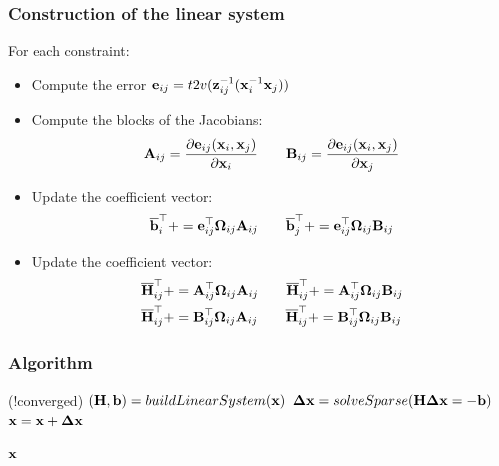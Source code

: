    \begin{frame}
   \frametitle{Construction of the linear system}
   For each constraint:
   \begin{itemize}
   \item Compute the error $\boldsymbol{\mathbf{e}}_{ij} = t2v({\boldsymbol{\mathbf{z}}}^{-1}_{ij}({\boldsymbol{\mathbf{x}}}^{-1}_{i}\boldsymbol{\mathbf{x}}_{j}))$
   \item Compute the blocks of the Jacobians:
   \begin{equation*}
   \boldsymbol{\mathbf{A}}_{ij} = \dfrac{\partial\boldsymbol{\mathbf{e}} _{ij}(\boldsymbol{\mathbf{x}} _{i}, \boldsymbol{\mathbf{x}} _{j})}{\partial\boldsymbol{\mathbf{x}} _{i}} \quad \quad \boldsymbol{\mathbf{B}}_{ij} = \dfrac{\partial\boldsymbol{\mathbf{e}} _{ij}(\boldsymbol{\mathbf{x}} _{i}, \boldsymbol{\mathbf{x}} _{j})}{\partial\boldsymbol{\mathbf{x}} _{j}}
    \end{equation*}
    \item Update the coefficient vector:
    \begin{equation*}
    \overline{\boldsymbol{\mathbf{b}}}_{i}^{\top} += \boldsymbol{\mathbf{e}}_{ij}^{\top}\boldsymbol{\mathbf{\Omega}}_{ij}\boldsymbol{\mathbf{A}}_{ij} \quad \quad \overline{\boldsymbol{\mathbf{b}}}_{j}^{\top} += \boldsymbol{\mathbf{e}}_{ij}^{\top}\boldsymbol{\mathbf{\Omega}}_{ij}\boldsymbol{\mathbf{B}}_{ij}
    \end{equation*}
   
    \item Update the coefficient vector:
    \begin{align*}
    \overline{\boldsymbol{\mathbf{H}}}_{ij}^{\top} &+= \boldsymbol{\mathbf{A}}_{ij}^{\top}\boldsymbol{\mathbf{\Omega}}_{ij}\boldsymbol{\mathbf{A}}_{ij} \quad \quad \overline{\boldsymbol{\mathbf{H}}}_{ij}^{\top} += \boldsymbol{\mathbf{A}}_{ij}^{\top}\boldsymbol{\mathbf{\Omega}}_{ij}\boldsymbol{\mathbf{B}}_{ij} \\
    \overline{\boldsymbol{\mathbf{H}}}_{ij}^{\top} &+= \boldsymbol{\mathbf{B}}_{ij}^{\top}\boldsymbol{\mathbf{\Omega}}_{ij}\boldsymbol{\mathbf{A}}_{ij} \quad \quad \overline{\boldsymbol{\mathbf{H}}}_{ij}^{\top} += \boldsymbol{\mathbf{B}}_{ij}^{\top}\boldsymbol{\mathbf{\Omega}}_{ij}\boldsymbol{\mathbf{B}}_{ij}
    \end{align*}
    \end{itemize}
   
   \end{frame}
   
   \begin{frame}
    \frametitle{Algorithm}
   
    \begin{algorithmic}[1]
    \While (!converged)
    \State $(\boldsymbol{\mathbf{H}},\boldsymbol{\mathbf{b}}) = buildLinearSystem(\boldsymbol{\mathbf{x}})$
    \State $\boldsymbol{\mathbf{\Delta}}\boldsymbol{\mathbf{x}} = solveSparse(\boldsymbol{\mathbf{H}}\boldsymbol{\mathbf{\Delta}}\boldsymbol{\mathbf{x}} = -\boldsymbol{\mathbf{b}})$
    \State $\boldsymbol{\mathbf{x}} = \boldsymbol{\mathbf{x}} + \boldsymbol{\mathbf{\Delta}}\boldsymbol{\mathbf{x}}$
    \EndWhile
   
    \State \Return $\boldsymbol{\mathbf{x}}$
    \EndProcedure
    \end{algorithmic}
   
   \end{frame}
   
